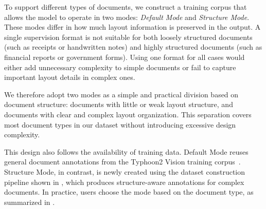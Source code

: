 \documentclass[]{typhoon} %
\begin{document}
To support different types of documents, we construct a training corpus that allows the model to operate in two modes: \emph{Default Mode} and \emph{Structure Mode}. These modes differ in how much layout information is preserved in the output. A single supervision format is not suitable for both loosely structured documents (such as receipts or handwritten notes) and highly structured documents (such as financial reports or government forms). Using one format for all cases would either add unnecessary complexity to simple documents or fail to capture important layout details in complex ones.

We therefore adopt two modes as a simple and practical division based on document structure: documents with little or weak layout structure, and documents with clear and complex layout organization. This separation covers most document types in our dataset without introducing excessive design complexity.

This design also follows the availability of training data. Default Mode reuses general document annotations from the Typhoon2 Vision training corpus~\citep{typhoon2}. Structure Mode, in contrast, is newly created using the dataset construction pipeline shown in , which produces structure-aware annotations for complex documents. In practice, users choose the mode based on the document type, as summarized in .





\end{document}
